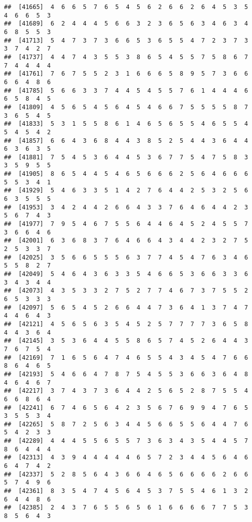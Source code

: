 \documentclass[
]{book}
\begin{document}
\begin{verbatim}
##  [41665]  4  6  6  5  7  6  5  4  5  6  2  6  6  2  6  4  5  3  5  4  6  6  5  3
##  [41689]  6  2  4  4  4  5  6  6  3  2  3  6  5  6  3  4  6  3  4  6  8  5  5  3
##  [41713]  5  4  7  3  7  3  6  6  5  3  6  5  5  4  7  2  3  7  3  3  7  4  2  7
##  [41737]  4  4  7  4  3  5  5  3  8  6  5  4  5  5  7  5  8  6  7  7  4  4  4  4
##  [41761]  7  6  7  5  5  2  3  1  6  6  6  5  8  9  5  7  3  6  6  6  6  4  8  6
##  [41785]  5  6  6  3  3  7  4  4  5  4  5  5  7  6  1  4  4  4  6  6  5  8  4  5
##  [41809]  4  5  6  5  4  5  6  4  5  4  6  6  7  5  5  5  5  8  7  3  6  5  4  5
##  [41833]  5  3  1  5  5  8  6  1  4  6  5  6  5  5  4  6  5  5  4  5  4  5  4  2
##  [41857]  6  6  4  3  6  8  4  4  3  8  5  2  5  4  4  3  6  4  4  6  3  6  3  5
##  [41881]  7  5  4  5  3  6  4  4  5  3  6  7  7  5  4  7  5  8  3  3  5  9  5  5
##  [41905]  8  6  5  4  4  5  4  6  5  6  6  6  2  5  6  4  6  6  6  5  5  3  4  1
##  [41929]  5  4  6  3  3  5  1  4  2  7  6  4  4  2  5  3  2  5  6  6  3  5  5  5
##  [41953]  3  4  2  4  4  2  6  6  4  3  3  7  6  4  6  4  4  2  3  5  6  7  4  3
##  [41977]  7  9  5  4  6  7  5  5  6  4  4  6  4  5  2  4  5  5  7  3  6  6  4  6
##  [42001]  6  3  6  8  3  7  6  4  6  6  4  3  4  4  2  3  2  7  5  2  5  3  3  7
##  [42025]  3  5  6  6  5  5  5  6  3  7  7  4  5  4  7  6  3  4  6  5  5  8  2  7
##  [42049]  5  4  6  4  3  6  3  3  5  4  6  6  5  3  6  6  3  3  6  3  4  3  4  4
##  [42073]  4  3  5  3  3  2  7  5  2  7  7  4  6  7  3  7  5  5  2  6  5  3  3  3
##  [42097]  5  6  5  4  5  2  6  6  4  4  7  3  6  4  1  3  7  4  7  4  4  6  4  3
##  [42121]  4  5  6  5  6  3  5  4  5  2  5  7  7  7  7  3  6  5  8  4  4  3  6  4
##  [42145]  3  5  3  6  4  4  5  5  8  6  5  7  4  5  2  6  4  4  3  7  6  7  5  4
##  [42169]  7  1  6  5  6  4  7  4  6  5  5  4  3  4  5  4  7  6  6  8  6  4  6  5
##  [42193]  5  4  6  6  4  7  8  7  5  4  5  5  3  6  6  3  6  4  8  4  6  4  6  7
##  [42217]  3  7  4  3  7  3  6  4  4  2  5  6  5  2  8  7  5  5  4  6  6  8  6  4
##  [42241]  6  7  4  6  5  6  4  2  3  5  6  7  6  9  9  4  7  6  5  3  5  5  3  4
##  [42265]  5  8  7  2  5  6  3  4  4  5  6  6  5  5  6  4  4  7  6  5  4  2  3  3
##  [42289]  4  4  4  5  5  6  5  5  7  3  6  3  4  3  5  4  4  5  7  8  6  4  4  4
##  [42313]  4  3  9  4  4  4  4  4  6  5  7  2  3  4  4  5  6  4  6  6  4  7  4  2
##  [42337]  5  2  8  5  6  4  3  6  6  4  6  5  6  6  6  6  2  6  6  5  7  4  9  6
##  [42361]  8  3  5  4  7  4  5  6  4  5  3  7  5  5  4  6  1  3  2  6  4  4  8  6
##  [42385]  2  4  3  7  6  5  5  6  5  6  1  6  6  6  6  7  7  5  3  8  5  6  4  3

\end{verbatim}
\end{document}
